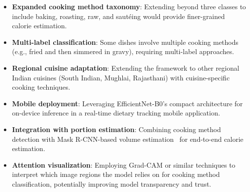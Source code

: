 \documentclass[journal]{IEEEtran}
\begin{document}
\begin{itemize}
    \item \textbf{Expanded cooking method taxonomy}: Extending beyond three classes to include baking, roasting, raw, and saut\'{e}ing would provide finer-grained calorie estimation.
    \item \textbf{Multi-label classification}: Some dishes involve multiple cooking methods (e.g., fried and then simmered in gravy), requiring multi-label approaches.
    \item \textbf{Regional cuisine adaptation}: Extending the framework to other regional Indian cuisines (South Indian, Mughlai, Rajasthani) with cuisine-specific cooking techniques.
    \item \textbf{Mobile deployment}: Leveraging EfficientNet-B0's compact architecture for on-device inference in a real-time dietary tracking mobile application.
    \item \textbf{Integration with portion estimation}: Combining cooking method detection with Mask R-CNN-based volume estimation~\cite{rajkumar2024deep} for end-to-end calorie estimation.
    \item \textbf{Attention visualization}: Employing Grad-CAM or similar techniques to interpret which image regions the model relies on for cooking method classification, potentially improving model transparency and trust.
\end{itemize}


\end{document}
